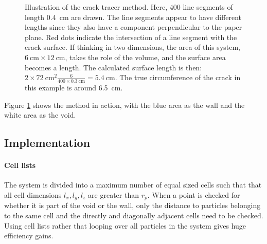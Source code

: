 \begin{figure}
\centering
{}
\caption{Illustration of the crack tracer method. Here, 400 line segments of length \SI{0.4}{\centi\meter} are drawn. The line segments appear to have different lengths since they also have a component perpendicular to the paper plane. Red dots indicate the intersection of a line segment with the crack surface.  If thinking in two dimensions, the area of this system, $\SI{6}{\centi\meter} \times \SI{12}{\centi\meter}$, takes the role of the volume, and the surface area becomes a length. The calculated surface length is then: $2\times \SI{72}{\centi\meter\squared} \frac{6}{400\times \SI{0.3}{\centi\meter}} = \SI{5.4}{\centi\meter}$. The true circumference of the crack in this example is around \SI{6.5}{\centi\meter}.}
\label{fig:crack_tracer_method}
\end{figure}

Figure \ref{fig:crack_tracer_method} shows the method in action, with the blue area as the wall and the white area as the void. 

\subsection{Implementation}
\paragraph{Cell lists}
The system is divided into a maximum number of equal sized cells such that that all cell dimensions $l_x, l_y, l_z$ are greater than $r_p$. When a point is checked for whether it is part of the void or the wall, only the distance to particles belonging to the same cell and the directly and diagonally adjacent cells need to be checked. Using cell lists rather that looping over all particles in the system gives huge efficiency gains.
